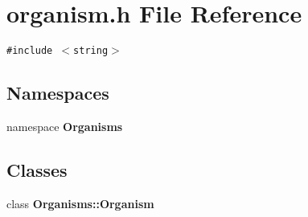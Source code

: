\section{organism.h File Reference}
\label{organism_8h}
{\tt \#include $<$string$>$}\par
\subsection*{Namespaces}
\begin{CompactItemize}
\item 
namespace \bf{Organisms}
\end{CompactItemize}
\subsection*{Classes}
\begin{CompactItemize}
\item 
class \bf{Organisms::Organism}
\end{CompactItemize}
